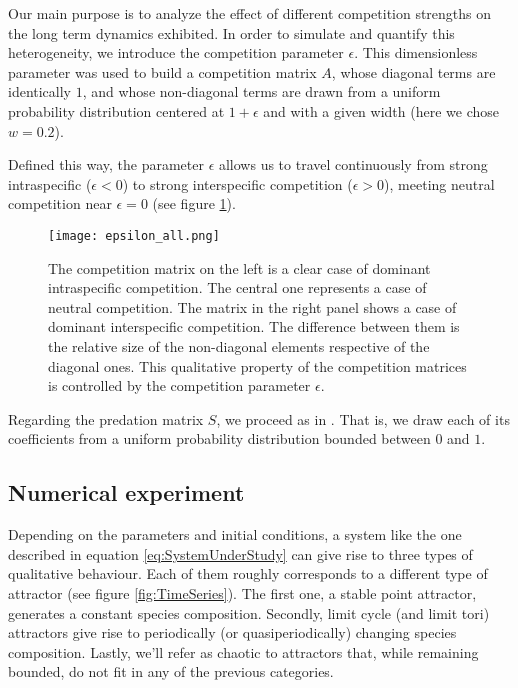 Our main purpose is to analyze the effect of different competition strengths on the long term dynamics exhibited. In order to simulate and quantify this heterogeneity, we introduce the competition parameter $ \epsilon $. This dimensionless parameter was used to build a competition matrix $A$, whose diagonal terms are identically $ 1 $, and whose non-diagonal terms are drawn from a uniform probability distribution centered at $ 1 + \epsilon $ and with a given width (here we chose $ w = 0.2$).

Defined this way, the parameter $\epsilon$ allows us to travel continuously from strong intraspecific ($ \epsilon < 0$) to strong interspecific competition ($ \epsilon > 0$), meeting neutral competition near $\epsilon = 0$ (see figure \ref{fig:CompetitionParameter}).

\begin{figure}[H]
	\begin{center}
		\texttt{[image: epsilon\_all.png]}
	\end{center}
	\caption{The competition matrix on the left is a clear case of dominant intraspecific competition. The central one represents a case of neutral competition. The matrix in the right panel shows a case of dominant interspecific competition. The difference between them is the relative size of the non-diagonal elements respective of the diagonal ones. This qualitative property of the competition matrices is controlled by the competition parameter $\epsilon$.}
	\label{fig:CompetitionParameter}
\end{figure}

Regarding the predation matrix $S$, we proceed as in \citet{Dakos2009b}. That is, we draw each of its coefficients from a uniform probability distribution bounded between $0$ and $1$.

\subsection{Numerical experiment}
\label{subsec:NumericalExperiment}

Depending on the parameters and initial conditions, a system like the one described in equation \ref{eq:SystemUnderStudy} can give rise to three types of qualitative behaviour. Each of them roughly corresponds to a different type of attractor (see figure \ref{fig:TimeSeries}). The first one, a stable point attractor, generates a constant species composition. Secondly, limit cycle (and limit tori) attractors give rise to periodically (or quasiperiodically) changing species composition. Lastly, we'll refer as chaotic to attractors that, while remaining bounded, do not fit in any of the previous categories.

